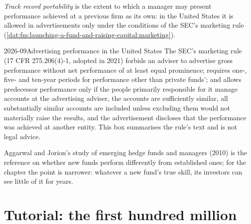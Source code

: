 \begin{definition}\label{def:fm:launching-a-fund-and-raising-capital:port}
\emph{Track record portability} is the extent to which a manager may present performance achieved at a previous firm
as its own: in the United States it is allowed in advertisements only under the conditions of the SEC's marketing rule
(\cref{dat:fm:launching-a-fund-and-raising-capital:marketing}).
\end{definition}

\begin{dated}{2026-09}{Advertising performance in the United States}\label{dat:fm:launching-a-fund-and-raising-capital:marketing}
The SEC's marketing rule (17 CFR 275.206(4)-1, adopted in 2021) forbids an adviser to advertise gross performance without net performance of at
least equal prominence; requires one-, five- and ten-year periods for performance other than private funds'; and allows predecessor performance only
if the people primarily responsible for it manage accounts at the advertising adviser, the accounts are sufficiently similar, all substantially
similar accounts are included unless excluding them would not materially raise the results, and the advertisement discloses that the performance
was achieved at another entity. This box summarises the rule's text and is not legal advice.
\end{dated}

Aggarwal and Jorion's study of emerging hedge funds and managers (2010) is the reference on whether new funds perform differently from established
ones; for the chapter the point is narrower: whatever a new fund's true skill, its investors can see little of it for years.

\section{Tutorial: the first hundred million}\label{tut:fm:launching-a-fund-and-raising-capital:tut}

